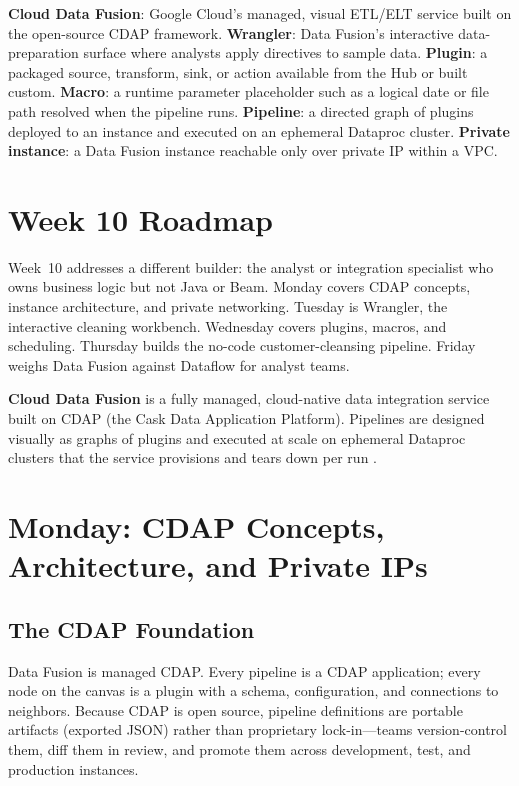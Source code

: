 \begin{keyterms}
\textbf{Cloud Data Fusion}: Google Cloud's managed, visual ETL/ELT service built on the open-source CDAP framework.
\textbf{Wrangler}: Data Fusion's interactive data-preparation surface where analysts apply directives to sample data.
\textbf{Plugin}: a packaged source, transform, sink, or action available from the Hub or built custom.
\textbf{Macro}: a runtime parameter placeholder such as a logical date or file path resolved when the pipeline runs.
\textbf{Pipeline}: a directed graph of plugins deployed to an instance and executed on an ephemeral Dataproc cluster.
\textbf{Private instance}: a Data Fusion instance reachable only over private IP within a VPC.
\end{keyterms}

\section{Week 10 Roadmap}
Week~10 addresses a different builder: the analyst or integration specialist who owns business logic but not Java or Beam. Monday covers CDAP concepts, instance architecture, and private networking. Tuesday is Wrangler, the interactive cleaning workbench. Wednesday covers plugins, macros, and scheduling. Thursday builds the no-code customer-cleansing pipeline. Friday weighs Data Fusion against Dataflow for analyst teams.

\begin{definitionbox}
\textbf{Cloud Data Fusion} is a fully managed, cloud-native data integration service built on CDAP (the Cask Data Application Platform). Pipelines are designed visually as graphs of plugins and executed at scale on ephemeral Dataproc clusters that the service provisions and tears down per run \cite{googleclouddatafusiondocs}.
\end{definitionbox}

\section{Monday: CDAP Concepts, Architecture, and Private IPs}

\subsection{The CDAP Foundation}
Data Fusion is managed CDAP. Every pipeline is a CDAP application; every node on the canvas is a plugin with a schema, configuration, and connections to neighbors. Because CDAP is open source, pipeline definitions are portable artifacts (exported JSON) rather than proprietary lock-in---teams version-control them, diff them in review, and promote them across development, test, and production instances.

